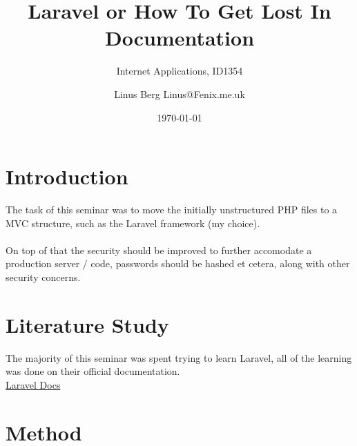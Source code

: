 \documentclass[a4paper]{scrartcl}
\title{Laravel or How To Get Lost In Documentation}
\subtitle{Internet Applications, ID1354}
\author{Linus Berg Linus@Fenix.me.uk}
\date{\today}
\begin{document}
\maketitle

\section{Introduction}

\noindent
The task of this seminar was to move the initially unstructured PHP files to a MVC structure,
such as the Laravel framework (my choice).
\noindent
\\\\
On top of that the security should be improved to further accomodate a production server / code,
passwords should be hashed et cetera, along with other security concerns.


\section{Literature Study}
The majority of this seminar was spent trying to learn Laravel, all of the learning was done
on their official documentation.\\
\href{https://laravel.com/docs/5.7}{Laravel Docs}


\section{Method}
\end{document}
